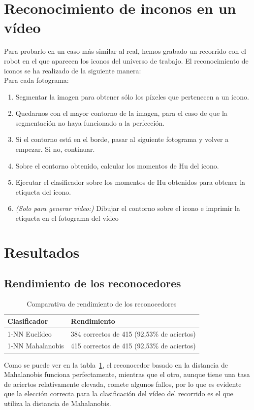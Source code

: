 \documentclass[11pt]{article}
\begin{document}
\section{Reconocimiento de inconos en un vídeo}

Para probarlo en un caso más similar al real, hemos grabado un recorrido con el robot en el que aparecen los iconos del universo de trabajo. El reconocimiento de iconos se ha realizado de la siguiente manera:
\\
Para cada fotograma:
\begin{enumerate}
\item Segmentar la imagen para obtener sólo los píxeles que pertenecen a un icono.
\item Quedarnos con el mayor contorno de la imagen, para el caso de que la segmentación no haya funcionado a la perfección.
\item Si el contorno está en el borde, pasar al siguiente fotograma y volver a empezar. Si no, continuar.
\item Sobre el contorno obtenido, calcular los momentos de Hu del icono.
\item Ejecutar el clasificador sobre los momentos de Hu obtenidos para obtener la etiqueta del icono.
\item \textit{(Solo para generar video:)} Dibujar el contorno sobre el icono e imprimir la etiqueta en el fotograma del vídeo
\end{enumerate}

\section{Resultados}
\subsection{Rendimiento de los reconocedores}
\begin{table}[ht]

  \begin{tabular}{|l|l|}
    \hline
    Clasificador & Rendimiento\\
    \hline\hline
    1-NN Euclídeo  & 384 correctos de 415 (92,53\% de aciertos)\\
    \hline
    1-NN Mahalanobis  & 415 correctos de 415 (92,53\% de aciertos)\\\hline

  \end{tabular}
  \caption{Comparativa de rendimiento de los reconocedores}\label{table-rendimiento}

\end{table}
Como se puede ver en la tabla~\ref{table-rendimiento}, el reconocedor basado en la distancia de Mahalanobis funciona perfectamente, mientras que el otro, aunque tiene una tasa de aciertos relativamente elevada, comete algunos fallos, por lo que es evidente que la elección correcta para la clasificación del vídeo del recorrido es el que utiliza la distancia de Mahalanobis.
\end{document}
